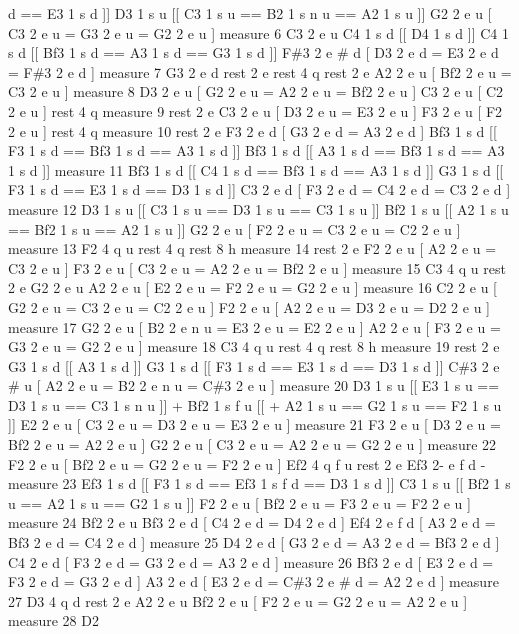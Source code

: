 d == E3 1 s d \mbox{]}\mbox{]} D3 1 s u \mbox{[}\mbox{[} C3 1 s u == B2 1 s n u == A2 1 s u \mbox{]}\mbox{]} G2 2 e u \mbox{[} C3 2 e u = G3 2 e u = G2 2 e u \mbox{]} measure 6 C3 2 e u C4 1 s d \mbox{[}\mbox{[} D4 1 s d \mbox{]}\mbox{]} C4 1 s d \mbox{[}\mbox{[} Bf3 1 s d == A3 1 s d == G3 1 s d \mbox{]}\mbox{]} F\#3 2 e \# d \mbox{[} D3 2 e d = E3 2 e d = F\#3 2 e d \mbox{]} measure 7 G3 2 e d rest 2 e rest 4 q rest 2 e A2 2 e u \mbox{[} Bf2 2 e u = C3 2 e u \mbox{]} measure 8 D3 2 e u \mbox{[} G2 2 e u = A2 2 e u = Bf2 2 e u \mbox{]} C3 2 e u \mbox{[} C2 2 e u \mbox{]} rest 4 q measure 9 rest 2 e C3 2 e u \mbox{[} D3 2 e u = E3 2 e u \mbox{]} F3 2 e u \mbox{[} F2 2 e u \mbox{]} rest 4 q measure 10 rest 2 e F3 2 e d \mbox{[} G3 2 e d = A3 2 e d \mbox{]} Bf3 1 s d \mbox{[}\mbox{[} F3 1 s d == Bf3 1 s d == A3 1 s d \mbox{]}\mbox{]} Bf3 1 s d \mbox{[}\mbox{[} A3 1 s d == Bf3 1 s d == A3 1 s d \mbox{]}\mbox{]} measure 11 Bf3 1 s d \mbox{[}\mbox{[} C4 1 s d == Bf3 1 s d == A3 1 s d \mbox{]}\mbox{]} G3 1 s d \mbox{[}\mbox{[} F3 1 s d == E3 1 s d == D3 1 s d \mbox{]}\mbox{]} C3 2 e d \mbox{[} F3 2 e d = C4 2 e d = C3 2 e d \mbox{]} measure 12 D3 1 s u \mbox{[}\mbox{[} C3 1 s u == D3 1 s u == C3 1 s u \mbox{]}\mbox{]} Bf2 1 s u \mbox{[}\mbox{[} A2 1 s u == Bf2 1 s u == A2 1 s u \mbox{]}\mbox{]} G2 2 e u \mbox{[} F2 2 e u = C3 2 e u = C2 2 e u \mbox{]} measure 13 F2 4 q u rest 4 q rest 8 h measure 14 rest 2 e F2 2 e u \mbox{[} A2 2 e u = C3 2 e u \mbox{]} F3 2 e u \mbox{[} C3 2 e u = A2 2 e u = Bf2 2 e u \mbox{]} measure 15 C3 4 q u rest 2 e G2 2 e u A2 2 e u \mbox{[} E2 2 e u = F2 2 e u = G2 2 e u \mbox{]} measure 16 C2 2 e u \mbox{[} G2 2 e u = C3 2 e u = C2 2 e u \mbox{]} F2 2 e u \mbox{[} A2 2 e u = D3 2 e u = D2 2 e u \mbox{]} measure 17 G2 2 e u \mbox{[} B2 2 e n u = E3 2 e u = E2 2 e u \mbox{]} A2 2 e u \mbox{[} F3 2 e u = G3 2 e u = G2 2 e u \mbox{]} measure 18 C3 4 q u rest 4 q rest 8 h measure 19 rest 2 e G3 1 s d \mbox{[}\mbox{[} A3 1 s d \mbox{]}\mbox{]} G3 1 s d \mbox{[}\mbox{[} F3 1 s d == E3 1 s d == D3 1 s d \mbox{]}\mbox{]} C\#3 2 e \# u \mbox{[} A2 2 e u = B2 2 e n u = C\#3 2 e u \mbox{]} measure 20 D3 1 s u \mbox{[}\mbox{[} E3 1 s u == D3 1 s u == C3 1 s n u \mbox{]}\mbox{]} + Bf2 1 s f u \mbox{[}\mbox{[} + A2 1 s u == G2 1 s u == F2 1 s u \mbox{]}\mbox{]} E2 2 e u \mbox{[} C3 2 e u = D3 2 e u = E3 2 e u \mbox{]} measure 21 F3 2 e u \mbox{[} D3 2 e u = Bf2 2 e u = A2 2 e u \mbox{]} G2 2 e u \mbox{[} C3 2 e u = A2 2 e u = G2 2 e u \mbox{]} measure 22 F2 2 e u \mbox{[} Bf2 2 e u = G2 2 e u = F2 2 e u \mbox{]} Ef2 4 q f u rest 2 e Ef3 2-\/ e f d -\/ measure 23 Ef3 1 s d \mbox{[}\mbox{[} F3 1 s d == Ef3 1 s f d == D3 1 s d \mbox{]}\mbox{]} C3 1 s u \mbox{[}\mbox{[} Bf2 1 s u == A2 1 s u == G2 1 s u \mbox{]}\mbox{]} F2 2 e u \mbox{[} Bf2 2 e u = F3 2 e u = F2 2 e u \mbox{]} measure 24 Bf2 2 e u Bf3 2 e d \mbox{[} C4 2 e d = D4 2 e d \mbox{]} Ef4 2 e f d \mbox{[} A3 2 e d = Bf3 2 e d = C4 2 e d \mbox{]} measure 25 D4 2 e d \mbox{[} G3 2 e d = A3 2 e d = Bf3 2 e d \mbox{]} C4 2 e d \mbox{[} F3 2 e d = G3 2 e d = A3 2 e d \mbox{]} measure 26 Bf3 2 e d \mbox{[} E3 2 e d = F3 2 e d = G3 2 e d \mbox{]} A3 2 e d \mbox{[} E3 2 e d = C\#3 2 e \# d = A2 2 e d \mbox{]} measure 27 D3 4 q d rest 2 e A2 2 e u Bf2 2 e u \mbox{[} F2 2 e u = G2 2 e u = A2 2 e u \mbox{]} measure 28 D2 